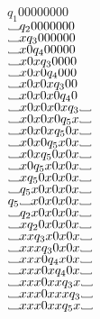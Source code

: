 \documentclass[12pt]{article}
\newcommand\Vtextvisiblespace[1][.8em]{%
	\mbox{\kern.07em\vrule height.3ex}%
	\vbox{\hrule width#1}%
	\hbox{\vrule height.3ex}}
\begin{document}
$q_1 00000000$ \\
$\Vtextvisiblespace           q_2 0000000 $  \\ 
$\Vtextvisiblespace x         q_3 000000  $  \\ 
$\Vtextvisiblespace x0        q_4 00000   $  \\ 
$\Vtextvisiblespace x0x       q_3 0000    $  \\ 
$\Vtextvisiblespace x0x0      q_4 000     $  \\ 
$\Vtextvisiblespace x0x0x     q_3 00      $  \\ 
$\Vtextvisiblespace x0x0x0    q_4 0       $  \\ 
$\Vtextvisiblespace x0x0x0x   q_3         \Vtextvisiblespace  $  \\ 
$\Vtextvisiblespace x0x0x0    q_5 x       \Vtextvisiblespace  $  \\ 
$\Vtextvisiblespace x0x0x     q_5 0x      \Vtextvisiblespace  $  \\ 
$\Vtextvisiblespace x0x0      q_5 x0x     \Vtextvisiblespace  $  \\ 
$\Vtextvisiblespace x0x       q_5 0x0x    \Vtextvisiblespace  $  \\ 
$\Vtextvisiblespace x0        q_5 x0x0x   \Vtextvisiblespace  $  \\ 
$\Vtextvisiblespace x         q_5 0x0x0x  \Vtextvisiblespace  $  \\ 
$\Vtextvisiblespace           q_5 x0x0x0x \Vtextvisiblespace  $  \\ 
$q_5 \Vtextvisiblespace           x0x0x0x \Vtextvisiblespace  $  \\ 
$\Vtextvisiblespace           q_2 x0x0x0x \Vtextvisiblespace  $  \\
$\Vtextvisiblespace x         q_2 0x0x0x  \Vtextvisiblespace  $  \\
$\Vtextvisiblespace xx        q_3 x0x0x   \Vtextvisiblespace  $  \\
$\Vtextvisiblespace xxx       q_3 0x0x    \Vtextvisiblespace  $  \\
$\Vtextvisiblespace xxx0      q_4 x0x     \Vtextvisiblespace  $  \\
$\Vtextvisiblespace xxx0x     q_4 0x      \Vtextvisiblespace  $  \\
$\Vtextvisiblespace xxx0xx    q_3 x       \Vtextvisiblespace  $  \\
$\Vtextvisiblespace xxx0xxx   q_3         \Vtextvisiblespace  $  \\
$\Vtextvisiblespace xxx0xx    q_5 x       \Vtextvisiblespace  $  \\
\end{document}
